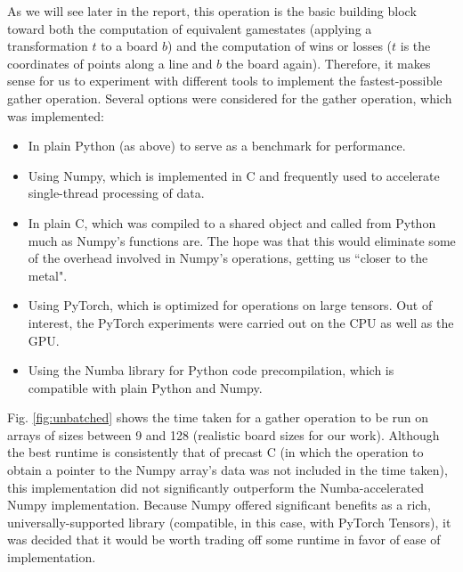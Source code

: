 \documentclass[12pt,a4paper]{article}
\begin{document}
As we will see later in the report, this operation is the basic building block toward both the computation of equivalent gamestates (applying a transformation $t$ to a board $b$) and the computation of wins or losses ($t$ is the coordinates of points along a line and $b$ the board again). Therefore, it makes sense for us to experiment with different tools to implement the fastest-possible gather operation.
Several options were considered for the gather operation, which was implemented:
\begin{itemize}\itemsep0pt
\item In plain Python (as above) to serve as a benchmark for performance.
\item Using Numpy, which is implemented in C and frequently used to accelerate single-thread processing of data.
\item In plain C, which was compiled to a shared object and called from Python much as Numpy's functions are. The hope was that this would eliminate some of the overhead involved in Numpy's operations, getting us ``closer to the metal". 
\item Using PyTorch, which is optimized for operations on large tensors. Out of interest, the PyTorch experiments were carried out on the CPU as well as the GPU.
\item Using the Numba library for Python code precompilation, which is compatible with plain Python and Numpy. 
\end{itemize}
Fig. \ref{fig:unbatched} shows the time taken for a gather operation to be run on arrays of sizes between 9 and 128 (realistic board sizes for our work).
Although the best runtime is consistently that of precast C (in which the operation to obtain a pointer to the Numpy array's data was not included in the time taken), this implementation did not significantly outperform the Numba-accelerated Numpy implementation. Because Numpy offered significant benefits as a rich, universally-supported library (compatible, in this case, with PyTorch Tensors), it was decided that it would be worth trading off some runtime in favor of ease of implementation.
\end{document}
